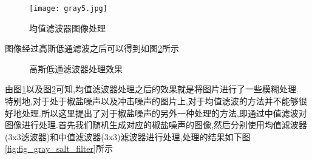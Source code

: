 \documentclass[UTF8,a4paper,10pt]{ctexart}
\begin{document}
\begin{flushleft}
\begin{figure}[htbp]
{\begin{minipage}[t]{0.5\linewidth}
                    \texttt{[image: gray5.jpg]}
                \end{minipage}%
            }%
            \caption{均值滤波器图像处理}
            \label{fig:fig_gray_mean_lowpass_filter}
        \end{figure}
        \hspace{2em}图像经过高斯低通滤波之后可以得到如图\ref{fig:fig_gray_gaussion_lowpass_filter}所示\\
        \begin{figure}[htbp]
            \centering
            \caption{高斯低通滤波器处理效果}
            \label{fig:fig_gray_gaussion_lowpass_filter}
        \end{figure}
        \hspace{2em}由图\ref{fig:fig_gray_mean_lowpass_filter}以及图\ref{fig:fig_gray_gaussion_lowpass_filter}可知,均值滤波器处理之后的效果就是将图片进行了一些模糊处理.\\
        \hspace{2em}特别地,对于处于椒盐噪声以及冲击噪声的图片上,对于均值滤波的方法并不能够很好地处理.所以这里提出了对于椒盐噪声的另外一种处理的方法,即通过中值滤波对图像进行处理.首先我们随机生成对应的椒盐噪声的图像,然后分别使用均值滤波器(3x3滤波器)和中值滤波器(3x3)滤波器进行处理,处理的结果如下图\ref{fig:fig_gray_salt_filter}所示\\

\end{flushleft}
\end{document}
